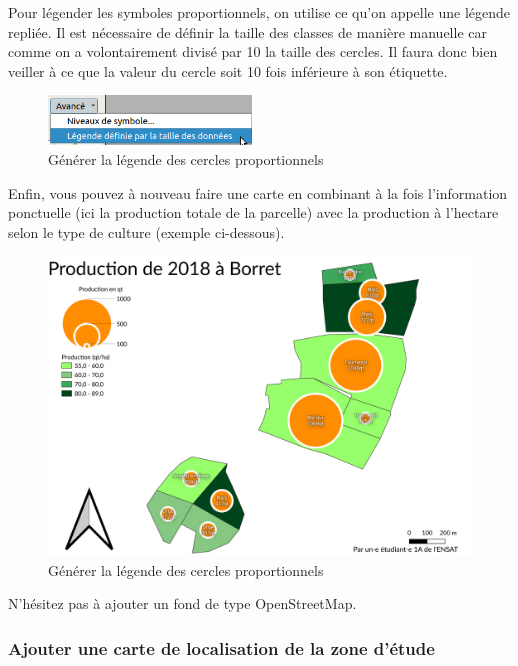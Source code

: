 Pour légender les symboles proportionnels, on utilise ce qu'on appelle
une légende repliée. Il est nécessaire de définir la taille des classes
de manière manuelle car comme on a volontairement divisé par 10 la
taille des cercles. Il faura donc bien veiller à ce que la valeur du
cercle soit 10 fois inférieure à son étiquette.

\begin{figure}
\centering
\includegraphics[width=\textwidth,height=0.52083in]{figures/legend_cercle.png}
\caption{Générer la légende des cercles proportionnels}
\end{figure}

Enfin, vous pouvez à nouveau faire une carte en combinant à la fois
l'information ponctuelle (ici la production totale de la parcelle) avec
la production à l'hectare selon le type de culture (exemple ci-dessous).

\begin{figure}
\centering
\includegraphics{figures/exemple_proportionnel.png}
\caption{Générer la légende des cercles proportionnels}
\end{figure}

N'hésitez pas à ajouter un fond de type OpenStreetMap.

\hypertarget{ajouter-une-carte-de-localisation-de-la-zone-duxe9tude}{%
\subsubsection{Ajouter une carte de localisation de la zone
d'étude}\label{ajouter-une-carte-de-localisation-de-la-zone-duxe9tude}}

